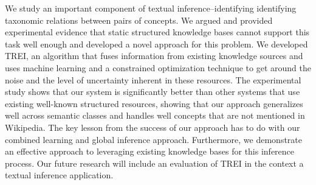 We study an important component of textual inference--identifying
identifying taxonomic relations between pairs of concepts.  We argued
and provided experimental evidence that static structured knowledge
bases cannot support this task well enough and developed a novel
approach for this problem.  We developed TREI, an algorithm that fuses
information from existing knowledge sources and uses machine learning
and a constrained optimization technique to get around the noise and
the level of uncertainty inherent in these resources. The experimental
study shows that our system is significantly better than other systems
that use existing well-known structured resources, showing that our
approach generalizes well across semantic classes and handles well
concepts that are not mentioned in Wikipedia. The key lesson from the
success of our approach has to do with our combined learning and
global inference approach. Furthermore, we demonstrate an effective
approach to leveraging existing knowledge bases for this inference
process. Our future research will include an evaluation of TREI in the
context a textual inference application.  

